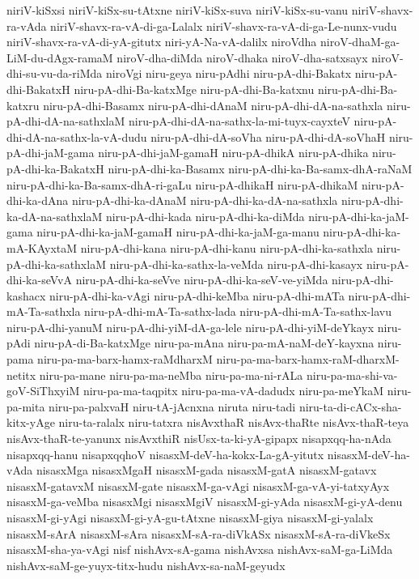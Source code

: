 {niriV-kiSxsi
niriV-kiSx-su-tAtxne
niriV-kiSx-suva
niriV-kiSx-su-vanu
niriV-shavx-ra-vAda
niriV-shavx-ra-vA-di-ga-Lalalx
niriV-shavx-ra-vA-di-ga-Le-nunx-vudu
niriV-shavx-ra-vA-di-yA-gitutx
niri-yA-Na-vA-dalilx
niroVdha
niroV-dhaM-ga-LiM-du-dAgx-ramaM
niroV-dha-diMda
niroV-dhaka
niroV-dha-satxsayx
niroV-dhi-su-vu-da-riMda
niroVgi
niru-geya
niru-pAdhi
niru-pA-dhi-Bakatx
niru-pA-dhi-BakatxH
niru-pA-dhi-Ba-katxMge
niru-pA-dhi-Ba-katxnu
niru-pA-dhi-Ba-katxru
niru-pA-dhi-Basamx
niru-pA-dhi-dAnaM
niru-pA-dhi-dA-na-sathxla
niru-pA-dhi-dA-na-sathxlaM
niru-pA-dhi-dA-na-sathx-la-mi-tuyx-cayxteV
niru-pA-dhi-dA-na-sathx-la-vA-dudu
niru-pA-dhi-dA-soVha
niru-pA-dhi-dA-soVhaH
niru-pA-dhi-jaM-gama
niru-pA-dhi-jaM-gamaH
niru-pA-dhikA
niru-pA-dhika
niru-pA-dhi-ka-BakatxH
niru-pA-dhi-ka-Basamx
niru-pA-dhi-ka-Ba-samx-dhA-raNaM
niru-pA-dhi-ka-Ba-samx-dhA-ri-gaLu
niru-pA-dhikaH
niru-pA-dhikaM
niru-pA-dhi-ka-dAna
niru-pA-dhi-ka-dAnaM
niru-pA-dhi-ka-dA-na-sathxla
niru-pA-dhi-ka-dA-na-sathxlaM
niru-pA-dhi-kada
niru-pA-dhi-ka-diMda
niru-pA-dhi-ka-jaM-gama
niru-pA-dhi-ka-jaM-gamaH
niru-pA-dhi-ka-jaM-ga-manu
niru-pA-dhi-ka-mA-KAyxtaM
niru-pA-dhi-kana
niru-pA-dhi-kanu
niru-pA-dhi-ka-sathxla
niru-pA-dhi-ka-sathxlaM
niru-pA-dhi-ka-sathx-la-veMda
niru-pA-dhi-kasayx
niru-pA-dhi-ka-seVvA
niru-pA-dhi-ka-seVve
niru-pA-dhi-ka-seV-ve-yiMda
niru-pA-dhi-kashacx
niru-pA-dhi-ka-vAgi
niru-pA-dhi-keMba
niru-pA-dhi-mATa
niru-pA-dhi-mA-Ta-sathxla
niru-pA-dhi-mA-Ta-sathx-lada
niru-pA-dhi-mA-Ta-sathx-lavu
niru-pA-dhi-yanuM
niru-pA-dhi-yiM-dA-ga-lele
niru-pA-dhi-yiM-deYkayx
niru-pAdi
niru-pA-di-Ba-katxMge
niru-pa-mAna
niru-pa-mA-naM-deY-kayxna
niru-pama
niru-pa-ma-barx-hamx-raMdharxM
niru-pa-ma-barx-hamx-raM-dharxM-netitx
niru-pa-mane
niru-pa-ma-neMba
niru-pa-ma-ni-rALa
niru-pa-ma-shi-va-goV-SiThxyiM
niru-pa-ma-taqpitx
niru-pa-ma-vA-dadudx
niru-pa-meYkaM
niru-pa-mita
niru-pa-palxvaH
niru-tA-jAcnxna
niruta
niru-tadi
niru-ta-di-cACx-sha-kitx-yAge
niru-ta-ralalx
niru-tatxra
nisAvxthaR
nisAvx-thaRte
nisAvx-thaR-teya
nisAvx-thaR-te-yanunx
nisAvxthiR
nisUsx-ta-ki-yA-gipapx
nisapxqq-ha-nAda
nisapxqq-hanu
nisapxqqhoV
nisasxM-deV-ha-kokx-La-gA-yitutx
nisasxM-deV-ha-vAda
nisasxMga
nisasxMgaH
nisasxM-gada
nisasxM-gatA
nisasxM-gatavx
nisasxM-gatavxM
nisasxM-gate
nisasxM-ga-vAgi
nisasxM-ga-vA-yi-tatxyAyx
nisasxM-ga-veMba
nisasxMgi
nisasxMgiV
nisasxM-gi-yAda
nisasxM-gi-yA-denu
nisasxM-gi-yAgi
nisasxM-gi-yA-gu-tAtxne
nisasxM-giya
nisasxM-gi-yalalx
nisasxM-sArA
nisasxM-sAra
nisasxM-sA-ra-diVkASx
nisasxM-sA-ra-diVkeSx
nisasxM-sha-ya-vAgi
nisf
nishAvx-sA-gama
nishAvxsa
nishAvx-saM-ga-LiMda
nishAvx-saM-ge-yuyx-titx-hudu
nishAvx-sa-naM-geyudx
}
